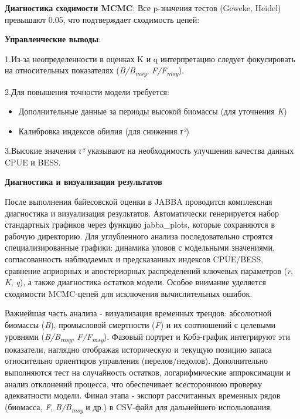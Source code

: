 \documentclass[
  letterpaper,
  DIV=11,
  numbers=noendperiod]{scrreprt}
\begin{document}
\textbf{Диагностика сходимости MCMC}: Все p-значения тестов (Geweke,
Heidel) превышают 0.05, что подтверждает сходимость цепей:

\textbf{Управленческие выводы}:

1.Из-за неопределенности в оценках K и q интерпретацию следует
фокусировать на относительных показателях
(\emph{B/B\textsubscript{msy}}, \emph{F/F\textsubscript{msy}}).

2.Для повышения точности модели требуется:

\begin{itemize}
\item
  Дополнительные данные за периоды высокой биомассы (для уточнения
  \emph{K})
\item
  Калибровка индексов обилия (для снижения \emph{τ²})
\end{itemize}

3.Высокие значения \emph{τ²} указывают на необходимость улучшения
качества данных CPUE и BESS.

\textbf{Диагностика и визуализация результатов}

После выполнения байесовской оценки в JABBA проводится комплексная
диагностика и визуализация результатов. Автоматически генерируется набор
стандартных графиков через функцию jabba\_plots, которые сохраняются в
рабочую директорию. Для углубленного анализа последовательно строятся
специализированные графики: динамика уловов с модельными значениями,
согласованность наблюдаемых и предсказанных индексов CPUE/BESS,
сравнение априорных и апостериорных распределений ключевых параметров
(\emph{r}, \emph{K}, \emph{q}), а также диагностика остатков модели.
Особое внимание уделяется сходимости MCMC-цепей для исключения
вычислительных ошибок.

Важнейшая часть анализа - визуализация временных трендов: абсолютной
биомассы (\emph{B}), промысловой смертности (\emph{F}) и их соотношений
с целевыми уровнями (\emph{B/B\textsubscript{msy}},
\emph{F/F\textsubscript{msy}}). Фазовый портрет и Кобэ-график
интегрируют эти показатели, наглядно отображая историческую и текущую
позицию запаса относительно ориентиров управления (перелов/недолов).
Дополнительно выполняются тест на случайность остатков, логарифмические
аппроксимации и анализ отклонений процесса, что обеспечивает
всестороннюю проверку адекватности модели. Финал этапа - экспорт
рассчитанных временных рядов (биомасса, \emph{F},
\emph{B/B\textsubscript{msy}} и др.) в CSV-файл для дальнейшего
использования.
\end{document}
